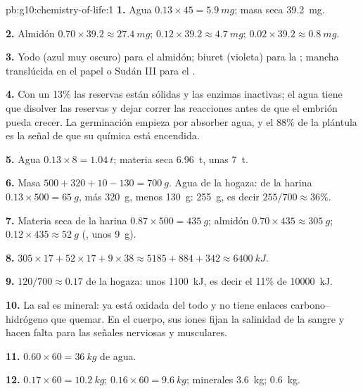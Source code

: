 \begin{solution}{pb:g10:chemistry-of-life:1}
\textbf{1.} Agua $0.13 \times 45 = \qty{5.9}{mg}$; masa seca
\qty{39.2}{mg}.

\textbf{2.} Almidón $0.70 \times 39.2 \approx \qty{27.4}{mg}$; 
$0.12 \times 39.2 \approx \qty{4.7}{mg}$;  $0.02 \times 39.2
\approx \qty{0.8}{mg}$.

\textbf{3.} Yodo (azul muy oscuro) para el almidón; biuret (violeta)
para la ; mancha translúcida en el papel o Sudán III para el
.

\textbf{4.} Con un 13\% las reservas están sólidas y las enzimas
inactivas; el agua tiene que disolver las reservas y dejar correr las
reacciones antes de que el embrión pueda crecer. La germinación empieza
por absorber agua, y el 88\% de la plántula es la señal de que su
química está encendida.

\textbf{5.} Agua $0.13 \times 8 = \qty{1.04}{t}$; materia seca
\qty{6.96}{t}, unas \qty{7}{t}.

\textbf{6.} Masa $500 + 320 + 10 - 130 = \qty{700}{g}$. Agua de la
hogaza: de la harina $0.13 \times 500 = \qty{65}{g}$, más \qty{320}{g},
menos \qty{130}{g}: \qty{255}{g}, es decir $255/700 \approx 36\%$.

\textbf{7.} Materia seca de la harina $0.87 \times 500 = \qty{435}{g}$;
almidón $0.70 \times 435 \approx \qty{305}{g}$;  $0.12 \times 435 \approx
\qty{52}{g}$ (, unos \qty{9}{g}).

\textbf{8.} $305 \times 17 + 52 \times 17 + 9 \times 38 \approx 5185 +
884 + 342 \approx \qty{6400}{kJ}$.

\textbf{9.} $120/700 \approx 0.17$ de la hogaza: unos \qty{1100}{kJ},
es decir el 11\% de \qty{10000}{kJ}.

\textbf{10.} La sal es mineral: ya está oxidada del todo y no tiene
enlaces carbono--hidrógeno que quemar. En el cuerpo, sus iones fijan la
salinidad de la sangre y hacen falta para las señales nerviosas y
musculares.

\textbf{11.} $0.60 \times 60 = \qty{36}{kg}$ de agua.

\textbf{12.}  $0.17 \times 60 = \qty{10.2}{kg}$;  $0.16
\times 60 = \qty{9.6}{kg}$; minerales \qty{3.6}{kg}; 
\qty{0.6}{kg}.


\end{solution}
